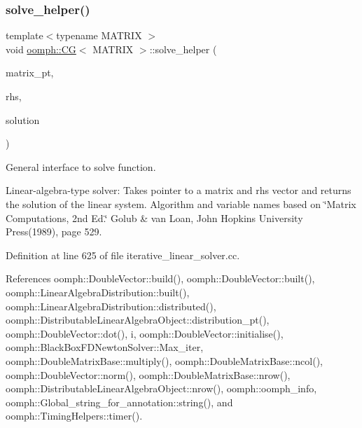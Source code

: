 \mbox{\label{classoomph_1_1CG_adbb17880d5464362b9e7a1cfa52dffec}} 
\subsubsection{\texorpdfstring{solve\+\_\+helper()}{solve\_helper()}}
{\footnotesize\ttfamily template$<$typename M\+A\+T\+R\+IX $>$ \\
void \hyperlink{classoomph_1_1CG}{oomph\+::\+CG}$<$ M\+A\+T\+R\+IX $>$\+::solve\+\_\+helper (\begin{DoxyParamCaption}\item[{\hyperlink{classoomph_1_1DoubleMatrixBase}{Double\+Matrix\+Base} $\ast$const \&}]{matrix\+\_\+pt,  }\item[{const \hyperlink{classoomph_1_1DoubleVector}{Double\+Vector} \&}]{rhs,  }\item[{\hyperlink{classoomph_1_1DoubleVector}{Double\+Vector} \&}]{solution }\end{DoxyParamCaption})\hspace{0.3cm}{\ttfamily [private]}}



General interface to solve function. 

Linear-\/algebra-\/type solver\+: Takes pointer to a matrix and rhs vector and returns the solution of the linear system. Algorithm and variable names based on \char`\"{}\+Matrix Computations,
2nd Ed.\char`\"{} Golub \& van Loan, John Hopkins University Press(1989), page 529. 

Definition at line 625 of file iterative\+\_\+linear\+\_\+solver.\+cc.



References oomph\+::\+Double\+Vector\+::build(), oomph\+::\+Double\+Vector\+::built(), oomph\+::\+Linear\+Algebra\+Distribution\+::built(), oomph\+::\+Linear\+Algebra\+Distribution\+::distributed(), oomph\+::\+Distributable\+Linear\+Algebra\+Object\+::distribution\+\_\+pt(), oomph\+::\+Double\+Vector\+::dot(), i, oomph\+::\+Double\+Vector\+::initialise(), oomph\+::\+Black\+Box\+F\+D\+Newton\+Solver\+::\+Max\+\_\+iter, oomph\+::\+Double\+Matrix\+Base\+::multiply(), oomph\+::\+Double\+Matrix\+Base\+::ncol(), oomph\+::\+Double\+Vector\+::norm(), oomph\+::\+Double\+Matrix\+Base\+::nrow(), oomph\+::\+Distributable\+Linear\+Algebra\+Object\+::nrow(), oomph\+::oomph\+\_\+info, oomph\+::\+Global\+\_\+string\+\_\+for\+\_\+annotation\+::string(), and oomph\+::\+Timing\+Helpers\+::timer().



